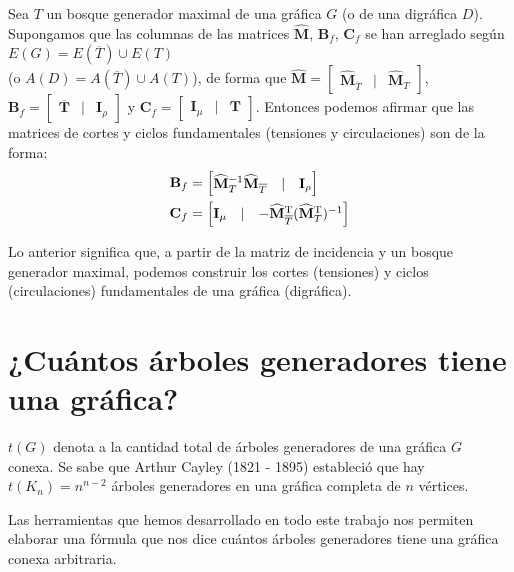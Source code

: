\begin{cor}
Sea $T$ un bosque generador maximal de una gráfica $G$ (o de una digráfica $D$). Supongamos que las columnas de las matrices  $\mathbf{\widehat{M}}$, $\mathbf{B}_{f}$, $\mathbf{C}_{f}$ se han arreglado según $E(G) = E(\overline{T}) \cup E(T)$ \\(o $A(D) = A(\overline{T}) \cup A(T)$), de forma que $\mathbf{\widehat{M}} = \begin{bmatrix} \mathbf{\widehat{M}}_{\overline{T}} & |& \mathbf{\widehat{M}}_{T} \end{bmatrix}$, $\mathbf{B}_{f} = \begin{bmatrix} \mathbf{\overline{T}} & |& \mathbf{I}_{\rho} \end{bmatrix}$ y $\mathbf{C}_{f} = \begin{bmatrix} \mathbf{I}_{\mu} & |& \mathbf{T} \end{bmatrix}$. Entonces podemos afirmar que las matrices de cortes y ciclos fundamentales (tensiones y circulaciones) son de la forma:
\begin{align*}
    \mathbf{B}_{f} &= \begin{bmatrix} \mathbf{\widehat{M}}_{T}^{-1}\mathbf{\widehat{M}}_{\overline{T}} & |& \mathbf{I}_{\rho} \end{bmatrix} \\
    \mathbf{C}_{f} &= \begin{bmatrix} \mathbf{I}_{\mu} & |& -\mathbf{\widehat{M}}_{\overline{T}}^{\textnormal{T}}(\mathbf{\widehat{M}}_{T}^{\textnormal{T}})^{-1}  \end{bmatrix}
\end{align*}
\end{cor}

Lo anterior significa que, a partir de la matriz de incidencia y un bosque generador maximal, podemos construir los cortes (tensiones) y ciclos (circulaciones) fundamentales de una gráfica (digráfica).

\section{¿Cuántos árboles generadores tiene una gráfica?}

$t(G)$ denota a la cantidad total de árboles generadores de una gráfica $G$ conexa. Se sabe que Arthur Cayley (1821 - 1895) estableció que hay $t(K_{n}) = n^{n-2}$ árboles generadores en una gráfica completa de $n$ vértices.

Las herramientas que hemos desarrollado en todo este trabajo nos permiten elaborar una fórmula que nos dice cuántos árboles generadores tiene una gráfica conexa arbitraria. 

